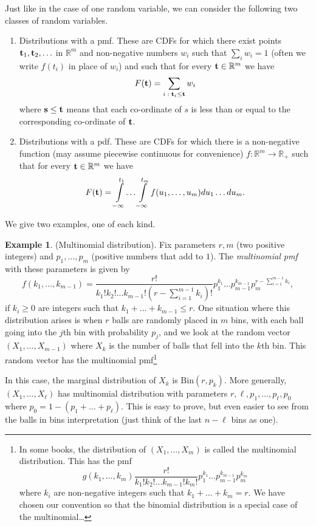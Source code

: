 \documentclass[preprint,  11pt]{amsart}
\newcommand{\para}[1]{\vspace{4mm}\noindent{\bfseries #1:}}
\theoremstyle{plain} %
\theoremstyle{definition} %
\newtheorem{example}[theorem]{Example}
\begin{document}
\para{Joint pmf and pdf} Just like in the case of one random variable, we can consider the following two classes of random variables.
\begin{enumerate}\setlength\itemsep{6pt}
\item Distributions with a pmf. These are CDFs for which there exist points ${\bf t}_{1},{\bf t}_{2},\ldots $ in $\mathbb{R}^{m}$ and non-negative numbers $w_{i}$ such that $\sum_{i}w_{i}=1$ (often we write $f(t_{i})$ in place of $w_{i}$) and such that for every ${\bf t}\in \mathbb{R}^{m}$ we have
$$ F({\bf t})=\sum_{i{\; : \;} {\bf t}_{i}\le {\bf t}} w_{i} $$
where ${\bf s}\le {\bf t}$ means that each co-ordinate of $s$ is less than or equal to the corresponding co-ordinate of ${\bf t}$.
\item Distributions with a pdf. These are CDFs for which there is a non-negative function (may assume piecewise continuous for convenience) $f:\mathbb{R}^{m}\rightarrow \mathbb{R}_{+}$ such that for every ${\bf t}\in \mathbb{R}^{m}$ we have
$$ F({\bf t})=\int\limits_{-\infty}^{t_{1}}\!\ldots \int\limits_{-\infty}^{t_{m}} f(u_{1},\ldots ,u_{m})du_{1}\ldots du_{m}. $$
\end{enumerate}
We give two examples, one of each kind. 
\begin{example} (Multinomial distribution). Fix parameters $r,m$ (two  positive integers) and $p_{1},\ldots ,p_{m}$ (positive numbers that add to $1$). The {\em multinomial pmf} with these parameters is given by
$$
f(k_{1},\ldots ,k_{m-1})=\frac{r!}{k_{1}!k_{2}!\ldots k_{m-1}!(r-\sum_{i=1}^{m-1}k_{i})!} p_{1}^{k_{1}}\ldots p_{m-1}^{k_{m-1}}p_{m}^{r-\sum_{i=1}^{m-1}k_{i}},
$$
if $k_{i}\ge 0$ are integers such that $k_{1}+\ldots +k_{m-1}\le r$. One situation where this distribution arises is when $r$ balls are randomly placed in $m$ bins, with each ball going into the $j$th bin with probability $p_{j}$, and we look at the random vector $(X_{1},\ldots ,X_{m-1})$ where $X_{k}$ is the number of balls that fell into the $k$th bin. This random vector has the multinomial pmf\footnote{In some books, the distribution of $(X_{1},\ldots ,X_{m})$ is called the multinomial distribution. This has the pmf $$g(k_{1},\ldots ,k_{m})\frac{r!}{k_{1}!k_{2}!\ldots k_{m-1}!k_{m}!} p_{1}^{k_{1}}\ldots p_{m-1}^{k_{m-1}}p_{m}^{k_{m}}$$ where $k_{i}$ are non-negative integers such that $k_{1}+\ldots +k_{m}=r$. We have chosen our convention so that the binomial distribution is a special case of the multinomial\dots }

In this case, the marginal distribution of $X_{k}$ is $\mbox{Bin}(r,p_{k})$. More generally, $(X_{1},\ldots ,X_{\ell})$ has multinomial distribution with parameters $r,\ell,p_{1},\ldots ,p_{\ell},p_{0}$ where $p_{0}=1-(p_{1}+\ldots +p_{\ell})$. This is easy to prove, but even easier to see from the balls in bins interpretation (just think of the last $n-\ell$ bins as one).
\end{example}
\end{document}
